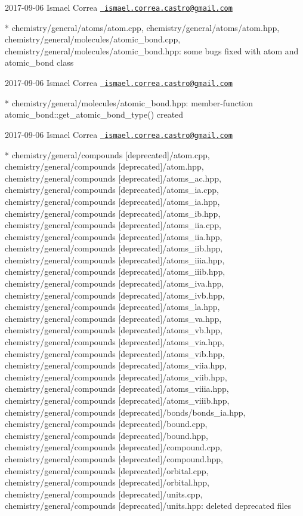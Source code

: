  2017-\/09-\/06 Ismael Correa \href{mailto:ismael.correa.castro@gmail.com}{\texttt{ ismael.\+correa.\+castro@gmail.\+com}} \begin{DoxyVerb}* chemistry/general/atoms/atom.cpp,
chemistry/general/atoms/atom.hpp,
chemistry/general/molecules/atomic_bond.cpp,
chemistry/general/molecules/atomic_bond.hpp: some bugs fixed with
atom and atomic_bond class
\end{DoxyVerb}
 2017-\/09-\/06 Ismael Correa \href{mailto:ismael.correa.castro@gmail.com}{\texttt{ ismael.\+correa.\+castro@gmail.\+com}} \begin{DoxyVerb}* chemistry/general/molecules/atomic_bond.hpp: member-function
atomic_bond::get_atomic_bond_type() created
\end{DoxyVerb}
 2017-\/09-\/06 Ismael Correa \href{mailto:ismael.correa.castro@gmail.com}{\texttt{ ismael.\+correa.\+castro@gmail.\+com}} \begin{DoxyVerb}* chemistry/general/compounds [deprecated]/atom.cpp,
chemistry/general/compounds [deprecated]/atom.hpp,
chemistry/general/compounds [deprecated]/atoms_ac.hpp,
chemistry/general/compounds [deprecated]/atoms_ia.cpp,
chemistry/general/compounds [deprecated]/atoms_ia.hpp,
chemistry/general/compounds [deprecated]/atoms_ib.hpp,
chemistry/general/compounds [deprecated]/atoms_iia.cpp,
chemistry/general/compounds [deprecated]/atoms_iia.hpp,
chemistry/general/compounds [deprecated]/atoms_iib.hpp,
chemistry/general/compounds [deprecated]/atoms_iiia.hpp,
chemistry/general/compounds [deprecated]/atoms_iiib.hpp,
chemistry/general/compounds [deprecated]/atoms_iva.hpp,
chemistry/general/compounds [deprecated]/atoms_ivb.hpp,
chemistry/general/compounds [deprecated]/atoms_la.hpp,
chemistry/general/compounds [deprecated]/atoms_va.hpp,
chemistry/general/compounds [deprecated]/atoms_vb.hpp,
chemistry/general/compounds [deprecated]/atoms_via.hpp,
chemistry/general/compounds [deprecated]/atoms_vib.hpp,
chemistry/general/compounds [deprecated]/atoms_viia.hpp,
chemistry/general/compounds [deprecated]/atoms_viib.hpp,
chemistry/general/compounds [deprecated]/atoms_viiia.hpp,
chemistry/general/compounds [deprecated]/atoms_viiib.hpp,
chemistry/general/compounds [deprecated]/bonds/bonds_ia.hpp,
chemistry/general/compounds [deprecated]/bound.cpp,
chemistry/general/compounds [deprecated]/bound.hpp,
chemistry/general/compounds [deprecated]/compound.cpp,
chemistry/general/compounds [deprecated]/compound.hpp,
chemistry/general/compounds [deprecated]/orbital.cpp,
chemistry/general/compounds [deprecated]/orbital.hpp,
chemistry/general/compounds [deprecated]/units.cpp,
chemistry/general/compounds [deprecated]/units.hpp: deleted
deprecated files
\end{DoxyVerb}
